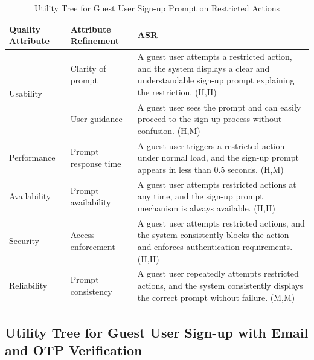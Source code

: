 \documentclass{article}
\begin{document}
\begin{table}[H]
\centering
\caption{Utility Tree for Guest User Sign-up Prompt on Restricted Actions}
\begin{tabular}{|p{3cm}|p{4cm}|p{7cm}|}
\hline
\textbf{Quality Attribute} & \textbf{Attribute Refinement} & \textbf{ASR} \\
\hline

\multirow{2}{*}{Usability}
& Clarity of prompt
& A guest user attempts a restricted action, and the system displays a clear and understandable sign-up prompt explaining the restriction. (H,H) \\
\cline{2-3}
& User guidance
& A guest user sees the prompt and can easily proceed to the sign-up process without confusion. (H,M) \\
\hline

Performance
& Prompt response time
& A guest user triggers a restricted action under normal load, and the sign-up prompt appears in less than 0.5 seconds. (H,M) \\
\hline

Availability
& Prompt availability
& A guest user attempts restricted actions at any time, and the sign-up prompt mechanism is always available. (H,H) \\
\hline

Security
& Access enforcement
& A guest user attempts restricted actions, and the system consistently blocks the action and enforces authentication requirements. (H,H) \\
\hline

Reliability
& Prompt consistency
& A guest user repeatedly attempts restricted actions, and the system consistently displays the correct prompt without failure. (M,M) \\
\hline

\end{tabular}
\end{table}

\subsection{Utility Tree for Guest User Sign-up with Email and OTP Verification}
\end{document}
